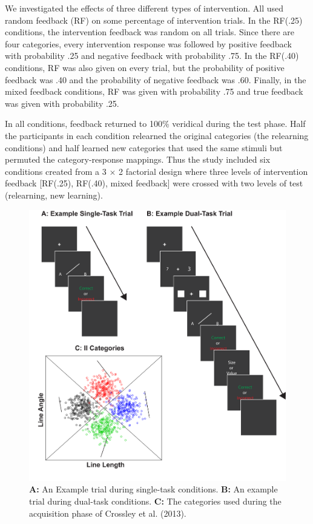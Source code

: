\documentclass[apacite,draftfirst,man]{apa6}
\begin{document}
We investigated the effects of three different types of intervention. All used
random feedback (RF) on some percentage of intervention trials. In the RF(.25)
conditions, the intervention feedback was random on all trials. Since there are
four categories, every intervention response was followed by positive feedback
with probability .25 and negative feedback with probability .75. In the RF(.40)
conditions, RF was also given on every trial, but the probability of positive
feedback was .40 and the probability of negative feedback was .60. Finally, in
the mixed feedback conditions, RF was given with probability .75 and true
feedback was given with probability .25.

In all conditions, feedback returned to 100\% veridical during the test phase.
Half the participants in each condition relearned the original categories (the
relearning conditions) and half learned new categories that used the same
stimuli but permuted the category-response mappings. Thus the study included six
conditions created from a 3 $\times$ 2 factorial design where three levels of
intervention feedback [RF(.25), RF(.40), mixed feedback] were crossed with two
levels of test (relearning, new learning).

\begin{figure}[t]
\centering \includegraphics[width=1.0\textwidth]{../figures/fig_trials.pdf}
  \caption{ \textbf{A:} An Example trial during single-task conditions.
\textbf{B:} An example trial during dual-task conditions. \textbf{C:} The
categories used during the acquisition phase of Crossley et al. (2013). }
  \label{fig:test_cats}
\end{figure}
\end{document}
